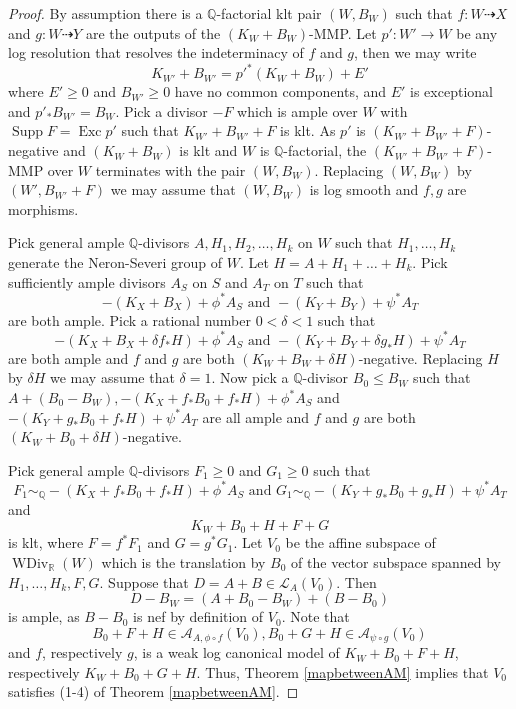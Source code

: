 \documentclass[11pt]{amsart}
\begin{document}
\begin{proof}
  By assumption there is a $\mathbb{Q}$-factorial klt pair $(W,B_{W})$ such that $f:W\dashrightarrow X$ and $g:W \dashrightarrow Y$ are the outputs of the $(K_{W}+B_{W})$-MMP. Let $p':W'\to W$ be any log resolution  that resolves the indeterminacy of $f$ and $g$, then we may write
  \[
    K_{W'}+B_{W'}=p'^*(K_{W}+B_{W})+E'
  \]
  where $E'\geqslant 0$ and $B_{W'}\geqslant 0$ have no common components, and $E'$ is exceptional and $p'_*B_{W'}=B_{W}$. Pick a divisor $-F$ which is ample over $W$ with $\operatorname{Supp}F=\operatorname{Exc}p'$ such that $K_{W'}+B_{W'}+F$ is klt. As $p'$ is $(K_{W'}+
    B_{W'}+F)$-negative and $(K_{W}+B_{W})$ is klt and $W$ is $\mathbb{Q}$-factorial, the $(K_{W'}+B_{W'}+F)$-MMP over $W$ terminates with the pair $(W,B_{W})$. Replacing $(W,B_{W})$ by $(W',B_{W'} +F)$ we may assume that $(W,B_{W})$ is log smooth and $f,g$ are morphisms.

  Pick general ample $\mathbb{Q}$-divisors $A, H_{1},H_{2},\ldots ,H_{k}$ on $W$ such that $H_{1},\ldots , H_{k}$ generate the Neron-Severi group of $W$. Let $H=A+H_{1}+\ldots+ H_{k}$. Pick sufficiently ample divisors $A_{S}$ on $S$ and $A_{T}$ on $T$ such that
  \[
    -(K_{X}+B_{X})+\phi^*A_{S} \text{ and } -(K_{Y}+B_{Y})+\psi^*A_{T}
  \]
  are both ample. Pick a rational number $0<\delta<1$ such that
  \[
    -(K_{X}+B_{X}+\delta f_*H)+\phi^*A_{S} \text{ and } -(K_{Y}+B_{Y}+\delta g_*H)+\psi^*A_{T}
  \]
  are both ample and  $f$ and  $g$ are both  $(K_{W}+B_{W}+\delta H)$-negative. Replacing $H$ by $\delta H$ we may assume that $\delta=1$. Now pick a $\mathbb{Q}$-divisor $B_{0}\leqslant B_{W}$ such that $A+(B_{0}-B_{W}), -(K_{X}+ f_*B_{0}+f_*H)+\phi^*A_{S}$ and $-(K_{Y}+ g_*B_{0}+f_*H)+\psi^*A_{T}$  are all ample and $f$ and  $g$ are both  $(K_{W}+B_{0}+\delta H)$-negative.

  Pick general ample $\mathbb{Q}$-divisors $F_{1}\geqslant 0$ and $G_{1}\geqslant 0$  such that
  \[
    F_{1}\sim_{\mathbb{Q}} -(K_{X}+f_*B_{0}+ f_*H)+\phi^*A_{S} \text{ and } G_{1}\sim_{\mathbb{Q}} -(K_{Y}+g_*B_{0}+ g_*H)+\psi^*A_{T}
  \]
  and
  \[
    K_{W}+B_{0}+H+F+G
  \]
  is klt, where $F=f^*F_{1}$ and $G=g^*G_{1}$.
  Let $V_{0}$ be the affine subspace of $\operatorname{WDiv}_{\mathbb{R}}(W)$ which is the translation by $B_{0}$ of the vector subspace  spanned by $H_{1},\ldots , H_{k},F,G$. Suppose that $D=A+B \in \mathcal{L}_{A}(V_{0})$. Then
  \[
    D-B_W=(A+B_{0}-B_{W})+(B-B_{0})
  \]
  is ample, as $B-B_{0}$ is nef by definition of $V_{0}$. Note that
  \[
    B_{0}+F+H \in \mathcal{A}_{A,\phi\circ f}(V_{0}), B_{0}+G+H \in \mathcal{A}_{\psi \circ g}(V_{0})
  \]
  and $f$, respectively $g$, is a weak log canonical model of $K_{W}+B_{0}+F+H$, respectively $K_{W}+B_{0}+G+H$. Thus, Theorem \ref{mapbetweenAM} implies that $V_{0}$ satisfies (1-4) of Theorem \ref{mapbetweenAM}.


\end{proof}
\end{document}
